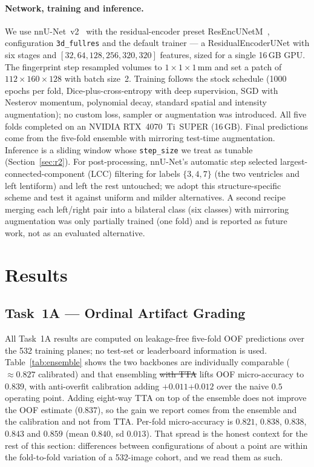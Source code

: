 \documentclass[runningheads]{llncs}
\newcommand{\addtwo}[1]{\textcolor{revtwo}{#1}}
\newcommand{\addself}[1]{\textcolor{revself}{#1}}
\newcommand{\delself}[1]{\textcolor{revself}{\sout{#1}}}
\begin{document}
\paragraph{Network, training and inference.}
We use nnU-Net~v2~\cite{isensee2021nnunet} with the residual-encoder preset
ResEncUNetM~\cite{isensee2024revisited}, configuration \texttt{3d\_fullres} and
the default trainer --- a ResidualEncoderUNet with six stages and
$[32,64,128,256,320,320]$ features, sized for a single 16\,GB GPU. The
fingerprint step resampled volumes to $1\times1\times1$\,mm and set a patch of
$112\times160\times128$ with batch size~2. Training follows the stock schedule
(1000 epochs per fold, Dice-plus-cross-entropy with deep supervision, SGD with
Nesterov momentum, polynomial decay, standard spatial and intensity
augmentation); no custom loss, sampler or augmentation was introduced. All five
folds completed on an NVIDIA RTX~4070~Ti~SUPER (16\,GB). Final predictions come
from the five-fold ensemble with mirroring test-time augmentation. Inference is a
sliding window whose \texttt{step\_size} we treat as tunable
(Section~\ref{sec:r2}). For post-processing, nnU-Net's automatic step selected
largest-connected-component (LCC) filtering for labels $\{3,4,7\}$ (the two
ventricles and left lentiform) and left the rest untouched; we adopt this
structure-specific scheme and test it against uniform and milder alternatives. A
second recipe merging each left/right pair into a bilateral class (six classes)
with mirroring augmentation was only partially trained (one fold) and is reported
as future work, not as an evaluated alternative.

\FloatBarrier
\section{Results}
\label{sec:results}

\subsection{Task~1A --- Ordinal Artifact Grading}
\label{sec:r1a}

All Task~1A results are computed on leakage-free five-fold OOF predictions over
the 532 training planes; no test-set or leaderboard information is used.
Table~\ref{tab:ensemble} shows the two backbones are individually comparable
($\approx0.827$ calibrated) and that ensembling \delself{with TTA} lifts OOF
micro-accuracy to 0.839, with anti-overfit calibration adding
\delself{$+0.011$}\addself{$+0.012$} over the naive $0.5$ operating point.
\addself{Adding eight-way TTA on top of the ensemble does not improve the OOF estimate
($0.837$), so the gain we report comes from the ensemble and the calibration and not
from TTA.} \addtwo{Per-fold micro-accuracy is $0.821$, $0.838$, $0.838$, $0.843$ and
$0.859$ (mean $0.840$, sd $0.013$). That spread is the honest context for the rest of
this section: differences between configurations of about a point are within the
fold-to-fold variation of a 532-image cohort, and we read them as such.}
\end{document}
